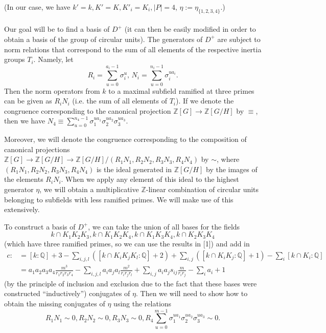 \documentclass[12pt,a4paper]{article}
\newcommand{\Q}{\mathbb{Q}}
\newcommand{\Z}{\mathbb{Z}}
\begin{document}
(In our case, we have $k'=k, K'=K, K'_i=K_i, |P|=4$, $\eta:=\eta_{\{1,2,3,4\}}$.)


\paragraph*{}
Our goal will be to find a basis of $D^+$ (it can then be easily modified in order to obtain a basis of the group of circular units). The generators of $D^+$ are subject to norm relations that correspond to the sum of all elements of the respective inertia groups $T_i$. Namely, let $$R_i=\sum_{u=0}^{a_i-1}\sigma_i^u,\, N_i=\sum_{u=0}^{n_i-1}\sigma_i^{ua_i}.$$ 
Then the norm operators from $k$ to a maximal subfield ramified at three primes can be given as $R_iN_i$ (i.e. the sum of all elements of $T_i$). If we denote the congruence corresponding to the canonical projection $\Z[G]\to \Z[G/H]$ by $\equiv$, then we have $N_4\equiv \sum_{u=0}^{n_4-1}\sigma_1^{ua_1}\sigma_2^{ua_2}\sigma_3^{ua_3}$.

Moreover, we will denote the congruence corresponding to the composition of canonical projections $\Z[G]\to \Z[G/H]\to \Z[G/H]/(R_1N_1,R_2N_2,R_3N_3,R_4N_4)$ by $\sim$, where $(R_1N_1,R_2N_2,R_3N_3,R_4N_4)$ is the ideal generated in $\Z[G/H]$ by the images of the elements $R_iN_i$. When we apply any element of this ideal to the highest generator $\eta$, we will obtain a multiplicative $\Z$-linear combination of circular units belonging to subfields with less ramified primes. We will make use of this extensively.

To construct a basis of $D^+$, we can take the union of all bases for the fields $$k\cap K_1K_2K_3,k\cap K_1K_2K_4,k\cap K_1K_3K_4,k\cap K_2K_3K_4$$ (which have three ramified primes, so we can use the results in [1]) and add in
\begin{equation*}
\begin{split}
c:&=[k:\Q]+3-\sum_{i,j,l}([k\cap K_iK_jK_l:\Q]+2)+\sum_{i,j}([k\cap K_iK_j:\Q]+1)-\sum_{i}[k\cap K_i:\Q]\\&=a_1a_2a_3a_4\frac{m^3}{r_1r_2r_3r_4}-\sum_{i,j,l}a_ia_ja_l\frac{m^2}{r_ir_jr_l}+\sum_{i,j}
a_ia_js_{ij}\frac{m}{r_ir_j}-\sum_{i}a_i+1
\end{split}
\end{equation*}
(by the principle of inclusion and exclusion due to the fact that these bases were constructed \enquote{inductively}) conjugates of $\eta$. Then we will need to show how to obtain the missing conjugates of $\eta$ using the relations $$R_1N_1\sim 0, R_2N_2\sim 0, R_3N_3\sim 0, R_4\sum_{u=0}^{m-1}\sigma_1^{ua_1}\sigma_2^{ua_2}\sigma_3^{ua_3}\sim 0.$$
\end{document}
